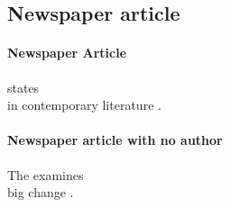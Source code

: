 \documentclass[a4paper,australian,oneside,12pt,footlines=3]{scrbook}%
\theoremstyle{remark}
\begin{document}
\begin{refsection}
\section{Newspaper article}
\paragraph{Newspaper Article}
\textcite{Westwood2014} states\textelp{}\\
\textelp{}in contemporary literature \parencite{Westwood2014}.

\paragraph{Newspaper article with no author}{}
The \textcite{AFR2012} examines\textelp{}\\
\textelp{}big change \parencite{AFR2012}.
\nocite{AFR2012}
\printbibliography[heading=subbibliography]
\end{refsection}
\end{document}
